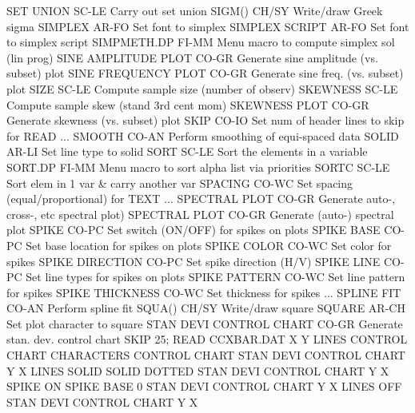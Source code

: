 SET UNION                   SC-LE Carry out set union
SIGM()                      CH/SY Write/draw Greek sigma
SIMPLEX                     AR-FO Set font to simplex
SIMPLEX SCRIPT              AR-FO Set font to simplex script
SIMPMETH.DP                 FI-MM Menu macro to compute simplex sol (lin prog)
SINE AMPLITUDE PLOT         CO-GR Generate sine amplitude (vs. subset) plot
SINE FREQUENCY PLOT         CO-GR Generate sine freq. (vs. subset) plot
SIZE                        SC-LE Compute sample size (number of observ)
SKEWNESS                    SC-LE Compute sample skew (stand 3rd cent mom)
SKEWNESS PLOT               CO-GR Generate skewness (vs. subset) plot
SKIP                        CO-IO Set num of header lines to skip for READ
... SMOOTH                  CO-AN Perform smoothing of equi-spaced data
SOLID                       AR-LI Set line type to solid
SORT                        SC-LE Sort the elements in a variable
SORT.DP                     FI-MM Menu macro to sort alpha list via priorities
SORTC                       SC-LE Sort elem in 1 var & carry another var
SPACING                     CO-WC Set spacing (equal/proportional) for TEXT
... SPECTRAL PLOT           CO-GR Generate auto-, cross-, etc spectral plot)
SPECTRAL PLOT               CO-GR Generate (auto-) spectral plot
SPIKE                       CO-PC Set switch (ON/OFF) for spikes on plots
SPIKE BASE                  CO-PC Set base location for spikes on plots
SPIKE COLOR                 CO-WC Set color for spikes
SPIKE DIRECTION             CO-PC Set spike direction (H/V)
SPIKE LINE                  CO-PC Set line types for spikes on plots
SPIKE PATTERN               CO-WC Set line pattern for spikes
SPIKE THICKNESS             CO-WC Set thickness for spikes
... SPLINE FIT              CO-AN Perform spline fit
SQUA()                      CH/SY Write/draw square
SQUARE                      AR-CH Set plot character to square
STAN DEVI CONTROL CHART     CO-GR Generate stan. dev. control chart
                                  SKIP 25; READ CCXBAR.DAT X Y
                                  LINES CONTROL CHART
                                  CHARACTERS CONTROL CHART
                                  STAN DEVI CONTROL CHART Y X
                                  LINES SOLID SOLID DOTTED
                                  STAN DEVI CONTROL CHART Y X
                                  SPIKE ON
                                  SPIKE BASE 0
                                  STAN DEVI CONTROL CHART Y X
                                  LINES OFF
                                  STAN DEVI CONTROL CHART Y X
